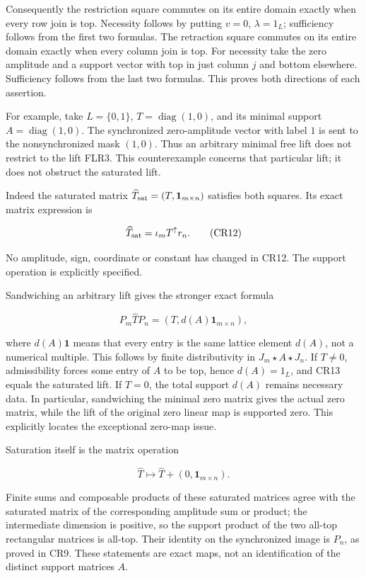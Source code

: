\documentclass[11pt]{article}
\begin{document}
Consequently the restriction square commutes on its entire domain exactly when every row join is top. Necessity follows by putting \(v=0\), \(\lambda=1_L\); sufficiency follows from the first two formulas. The retraction square commutes on its entire domain exactly when every column join is top. For necessity take the zero amplitude and a support vector with top in just column \(j\) and bottom elsewhere. Sufficiency follows from the last two formulas. This proves both directions of each assertion.

For example, take \(L=\{0,1\}\), \(T=\operatorname{diag}(1,0)\), and its minimal support \(A=\operatorname{diag}(1,0)\). The synchronized zero-amplitude vector with label \(1\) is sent to the nonsynchronized mask \((1,0)\). Thus an arbitrary minimal free lift does not restrict to the lift FLR3. This counterexample concerns that particular lift; it does not obstruct the saturated lift.

Indeed the saturated matrix \(\widehat T_{\rm sat}=(T,\mathbf1_{m\times n})\) satisfies both squares. Its exact matrix expression is

\[
\widehat T_{\rm sat}=\iota_mT^\uparrow r_n.
\tag{CR12}
\]

No amplitude, sign, coordinate or constant has changed in CR12. The support operation is explicitly specified.

Sandwiching an arbitrary lift gives the stronger exact formula

\[
P_m\widehat T P_n=(T,d(A)\mathbf1_{m\times n}),
\tag{CR13}
\]

where \(d(A)\mathbf1\) means that every entry is the same lattice element \(d(A)\), not a numerical multiple. This follows by finite distributivity in \(J_m\star A\star J_n\). If \(T\ne0\), admissibility forces some entry of \(A\) to be top, hence \(d(A)=1_L\), and CR13 equals the saturated lift. If \(T=0\), the total support \(d(A)\) remains necessary data. In particular, sandwiching the minimal zero matrix gives the actual zero matrix, while the lift of the original zero linear map is supported zero. This explicitly locates the exceptional zero-map issue.

Saturation itself is the matrix operation

\[
\widehat T\longmapsto\widehat T+(0,\mathbf1_{m\times n}).
\tag{CR14}
\]

Finite sums and composable products of these saturated matrices agree with the saturated matrix of the corresponding amplitude sum or product; the intermediate dimension is positive, so the support product of the two all-top rectangular matrices is all-top. Their identity on the synchronized image is \(P_n\), as proved in CR9. These statements are exact maps, not an identification of the distinct support matrices \(A\).
\end{document}
